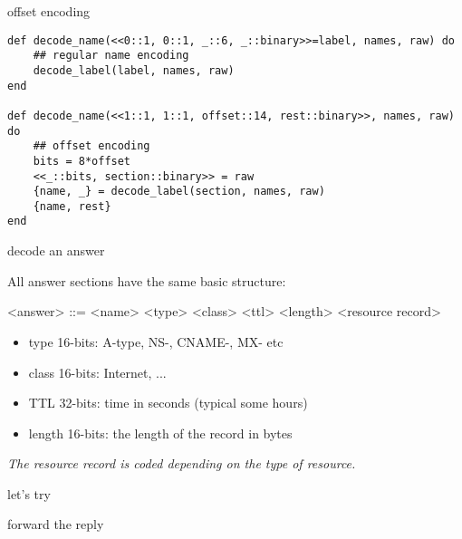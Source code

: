 \begin{frame}[fragile]{offset encoding}

\begin{verbatim}
def decode_name(<<0::1, 0::1, _::6, _::binary>>=label, names, raw) do
    ## regular name encoding
    decode_label(label, names, raw)
end
      
def decode_name(<<1::1, 1::1, offset::14, rest::binary>>, names, raw) do
    ## offset encoding
    bits = 8*offset
    <<_::bits, section::binary>> = raw
    {name, _} = decode_label(section, names, raw)
    {name, rest}
end
\end{verbatim}

\end{frame}

\begin{frame}[fragile]{decode an answer}

All answer sections have the same basic structure:

\begin{grammar}
<answer> ::= <name> <type> <class> <ttl> <length> <resource record>
\end{grammar}

\begin{itemize}
\item type 16-bits: A-type, NS-, CNAME-, MX- etc
\item class 16-bits: Internet, ...
\item TTL 32-bits: time in seconds (typical some hours)
\item length 16-bits: the length of the record in bytes
\end{itemize}

\vspace{10pt}\pause
{\em The resource record is coded depending on the type of resource.}

\end{frame}


\begin{frame}{let's try}


\end{frame}

\begin{frame}{forward the reply}

\end{frame}





